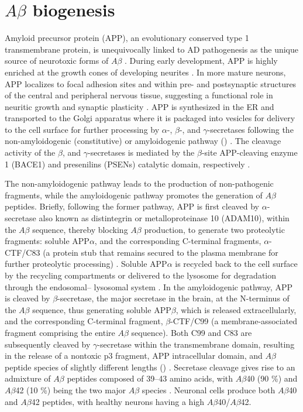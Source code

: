 \section{$A\beta$ biogenesis}
Amyloid precursor protein (APP), an evolutionary conserved type 1 transmembrane protein, is unequivocally linked to AD pathogenesis as the unique source of neurotoxic forms of $A\beta$ \citep{Chen2015,Rajendran2012}. During early development, APP is highly enriched at the growth cones of developing neurites \citep{Ramaker2016,Sabo2003}. In more mature neurons, APP localizes to focal adhesion sites and within pre- and postsynaptic structures of the central and peripheral nervous tissue, suggesting a functional role in neuritic growth and synaptic plasticity \citep{Ashley2005,Yamazaki1997}. APP is synthesized in the ER and transported to the Golgi apparatus where it is packaged into vesicles for delivery to the cell surface for further processing by $\alpha$-, $\beta$-, and $\gamma$-secretases following the non-amyloidogenic (constitutive) or amyloidogenic pathway () \citep{Obrien2011,Ramaker2016}. The cleavage activity of the $\beta$, and $\gamma$-secretases is mediated by the  $\beta$-site APP-cleaving enzyme 1 (BACE1) and presenilins (PSENs) catalytic domain, respectively \citep{Rajendran2012}. 

The non-amyloidogenic pathway leads to the production of non-pathogenic fragments, while the amyloidogenic pathway promotes the generation of $A\beta$ peptides. Briefly, following the former pathway, APP is first cleaved by $\alpha$-secretase also known as distintegrin or metalloproteinase 10 (ADAM10), within the $A\beta$ sequence, thereby blocking $A\beta$ production, to generate two proteolytic fragments: soluble APP$\alpha$, and the corresponding C-terminal fragments, $\alpha$-CTF/C83 (a protein stub that remains secured to the plasma membrane for further proteolytic processing) \citep{Gandy1994,Roychaudhuri2009}. Soluble APP$\alpha$ is recycled back to the cell surface by the recycling compartments or delivered to the lysosome for degradation through the endosomal– lysosomal system \citep{Caster2013,Golde1992}. In the amyloidogenic pathway, APP is cleaved by $\beta$-secretase, the major secretase in the brain, at the N-terminus of the $A\beta$ sequence, thus generating soluble APP$\beta$, which is released extracellularly, and the corresponding C-terminal fragment, $\beta$-CTF/C99 (a membrane-associated fragment comprising the entire $A\beta$ sequence). Both C99 and C83 are subsequently cleaved by $\gamma$-secretase within the transmembrane domain, resulting in the release of a nontoxic p3 fragment, APP intracellular domain, and $A\beta$ peptide species of slightly different lengths () \citep{Cole2007,Jarrett1993}. Secretase cleavage gives rise to an admixture of $A\beta$ peptides composed of 39–43 amino acids, with $A\beta$40 (90 \%) and $A\beta$42 (10 \%) being the two major $A\beta$ species \citep{Gouras2000,Takahasi2013}. Neuronal cells produce both $A\beta$40 and $A\beta$42 peptides, with healthy neurons having a high $A\beta$40/$A\beta$42.

